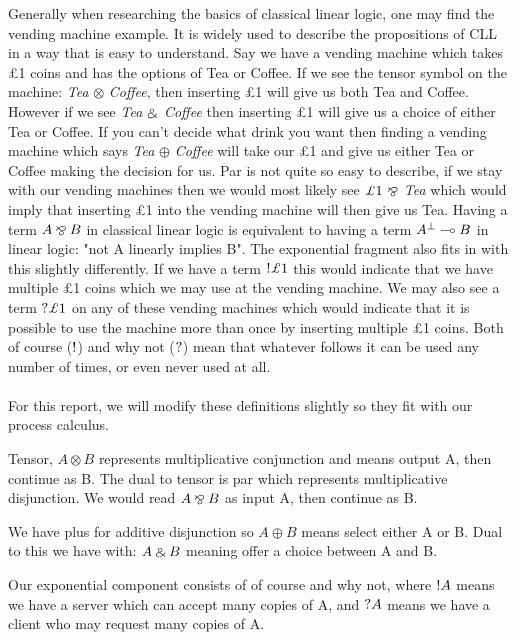 \noindent
Generally when researching the basics of classical linear logic, one may find the vending machine example. It is 
widely used to describe the propositions of CLL in a way that is easy to understand. Say we have a vending machine 
which takes \pounds 1 coins and has the options of Tea or Coffee. If we see the tensor symbol on the machine: \emph{Tea} 
$\otimes$ \emph{Coffee}, then inserting \pounds 1 will give us both Tea and Coffee. However if we see \emph{Tea} $\mathbin{\binampersand}$ \emph{Coffee} then 
inserting \pounds 1 will give us a choice of either Tea or Coffee. If you can't decide what drink you want then finding a 
vending machine which says \emph{Tea} $\oplus$ \emph{Coffee} will take our \pounds 1 and give us either Tea or Coffee making the decision 
for us. Par is not quite so easy to describe, if we stay with our vending machines then we would most likely see 
$\pounds 1 \ \parr$ \emph{Tea} which would imply that inserting \pounds 1 into the vending machine will then give us Tea. 
Having a term $A \mathbin{\bindnasrepma} B$ in classical linear logic is equivalent to having a term $\negg{A} \multimap B$ in linear logic:
"not A linearly implies B".
The exponential fragment also fits in with this slightly differently. If we have a term $\ofc \pounds 1$ this would indicate 
that we have multiple \pounds 1 coins which we may use at the vending machine. We may also see a term $\whynot \pounds 1$ 
on any of these vending machines which would indicate that it is possible to use the machine more than once by inserting 
multiple \pounds 1 coins. Both of course ($\textrm{!}$) and why not ($\textrm{?}$) mean that whatever follows it can be used any 
number of times, or even never used at all.
\\\\
\noindent
For this report, we will modify these definitions slightly so they fit with our process calculus.

Tensor, $A \otimes B$ represents multiplicative conjunction and means output A, then continue as B. The dual to tensor 
is par which represents multiplicative disjunction. We would read $A \mathbin{\bindnasrepma} B$ as input A, then continue as B. 

We have plus for additive disjunction so $A \oplus B$ means select either A or B.  Dual to this we have with: 
$A \mathbin{\binampersand} B$ meaning offer a choice between A and B. 

Our exponential component consists of of course and why not, where 
$\textrm{!} A$ means we have a server which can accept many copies of A, and $\textrm{?} A$ means we have a client 
who may request many copies of A. 

